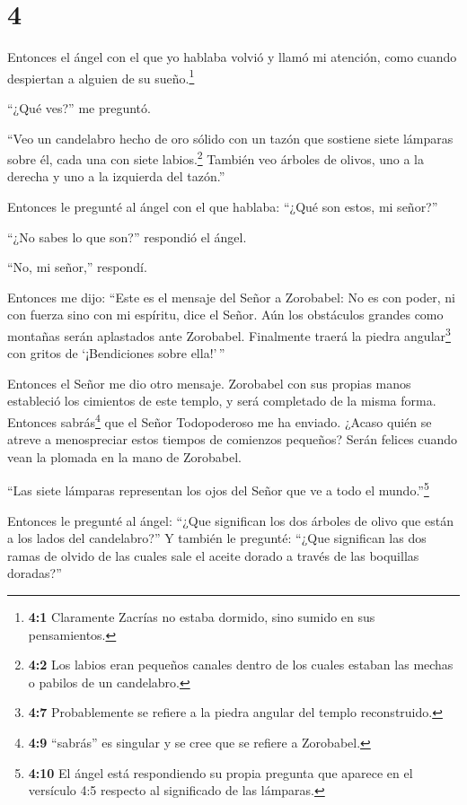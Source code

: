 \hypertarget{section-3}{%
\section{4}\label{section-3}}

 Entonces el ángel con el que yo hablaba volvió y llamó mi
atención, como cuando despiertan a alguien de su sueño.\footnote{\textbf{4:1}
  Claramente Zacrías no estaba dormido, sino sumido en sus pensamientos.}

 ``¿Qué ves?'' me preguntó.

``Veo un candelabro hecho de oro sólido con un tazón que sostiene siete
lámparas sobre él, cada una con siete labios.\footnote{\textbf{4:2} Los
  labios eran pequeños canales dentro de los cuales estaban las mechas o
  pabilos de un candelabro.}  También veo árboles de olivos,
uno a la derecha y uno a la izquierda del tazón.''

 Entonces le pregunté al ángel con el que hablaba: ``¿Qué
son estos, mi señor?''

 ``¿No sabes lo que son?'' respondió el ángel.

``No, mi señor,'' respondí.

 Entonces me dijo: ``Este es el mensaje del Señor a
Zorobabel: No es con poder, ni con fuerza sino con mi espíritu, dice el
Señor.  Aún los obstáculos grandes como montañas serán
aplastados ante Zorobabel. Finalmente traerá la piedra
angular\footnote{\textbf{4:7} Probablemente se refiere a la piedra
  angular del templo reconstruido.} con gritos de `¡Bendiciones sobre
ella!'\,''

 Entonces el Señor me dio otro mensaje. 
Zorobabel con sus propias manos estableció los cimientos de este templo,
y será completado de la misma forma. Entonces sabrás\footnote{\textbf{4:9}
  ``sabrás'' es singular y se cree que se refiere a Zorobabel.} que el
Señor Todopoderoso me ha enviado.  ¿Acaso quién se atreve a
menospreciar estos tiempos de comienzos pequeños? Serán felices cuando
vean la plomada en la mano de Zorobabel.

``Las siete lámparas representan los ojos del Señor que ve a todo el
mundo.''\footnote{\textbf{4:10} El ángel está respondiendo su propia
  pregunta que aparece en el versículo 4:5 respecto al significado de
  las lámparas.}

 Entonces le pregunté al ángel: ``¿Que significan los dos
árboles de olivo que están a los lados del candelabro?''  Y
también le pregunté: ``¿Que significan las dos ramas de olvido de las
cuales sale el aceite dorado a través de las boquillas doradas?''

